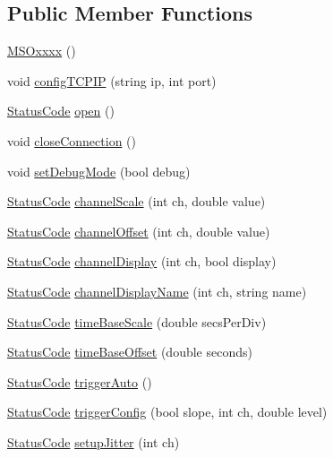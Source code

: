 \subsection*{Public Member Functions}
\begin{DoxyCompactItemize}
\item 
\hyperlink{classMSOxxxx_afa2d5e8dcabe88d8c4ef54238a4e7bc7}{MSOxxxx} ()
\item 
void \hyperlink{classMSOxxxx_a3fc4e785c764c2abb0c0c2da4d71108a}{configTCPIP} (string ip, int port)
\item 
\hyperlink{classStatusCode}{StatusCode} \hyperlink{classMSOxxxx_a4acff38c6f55795533c4d6b4cef6106b}{open} ()
\item 
void \hyperlink{classMSOxxxx_a65fd9540df836c24a044807f12071c92}{closeConnection} ()
\item 
void \hyperlink{classMSOxxxx_a59a1d5e5f537086590b60a93d5c4c8a1}{setDebugMode} (bool debug)
\item 
\hyperlink{classStatusCode}{StatusCode} \hyperlink{classMSOxxxx_ae08131dd88d4d7f95e870b69b2f5e0e6}{channelScale} (int ch, double value)
\item 
\hyperlink{classStatusCode}{StatusCode} \hyperlink{classMSOxxxx_ab77c05543d9478b140466b7505651ab8}{channelOffset} (int ch, double value)
\item 
\hyperlink{classStatusCode}{StatusCode} \hyperlink{classMSOxxxx_a4cb8e745f172b7a30953ec87923c8c76}{channelDisplay} (int ch, bool display)
\item 
\hyperlink{classStatusCode}{StatusCode} \hyperlink{classMSOxxxx_af9851b9ce16b0e88e8691c8174ba54f0}{channelDisplayName} (int ch, string name)
\item 
\hyperlink{classStatusCode}{StatusCode} \hyperlink{classMSOxxxx_a0327f511fdb8920ddabf1dbbd54f9e9f}{timeBaseScale} (double secsPerDiv)
\item 
\hyperlink{classStatusCode}{StatusCode} \hyperlink{classMSOxxxx_ac23ca74ef0e746fe1830bcf26952c42d}{timeBaseOffset} (double seconds)
\item 
\hyperlink{classStatusCode}{StatusCode} \hyperlink{classMSOxxxx_a44238c713464e76d4c3c2005413bdf76}{triggerAuto} ()
\item 
\hyperlink{classStatusCode}{StatusCode} \hyperlink{classMSOxxxx_a9019b632465638a13c409d8243fe83b4}{triggerConfig} (bool slope, int ch, double level)
\item 
\hyperlink{classStatusCode}{StatusCode} \hyperlink{classMSOxxxx_a829d87b0aa03840ebfe0a44e560c7f63}{setupJitter} (int ch)
\item 

\end{DoxyCompactItemize}
